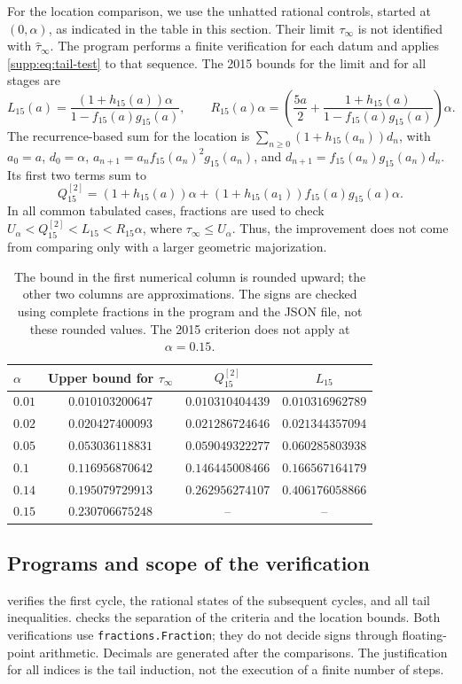 \documentclass[11pt,a4paper]{article}
\numberwithin{equation}{section}
\numberwithin{table}{section}
\theoremstyle{plain}
\theoremstyle{definition}\newtheorem{definition}[theorem]{Definition}
\theoremstyle{remark}\newtheorem{remark}[theorem]{Remark}
\begin{document}
For the location comparison, we use the unhatted rational controls,
started at $(0,\alpha)$, as indicated in the table in this section.
Their limit $\tau_\infty$ is not identified with $\widehat\tau_\infty$.
The program  performs a finite
verification for each datum and applies \eqref{supp:eq:tail-test}
to that sequence. The 2015 bounds for the limit and for all stages are
\[
 L_{15}(a)=\frac{(1+h_{15}(a))\alpha}{1-f_{15}(a)g_{15}(a)},\qquad
 R_{15}(a)\alpha=\left(\frac{5a}{2}+
 \frac{1+h_{15}(a)}{1-f_{15}(a)g_{15}(a)}\right)\alpha.
\]
The recurrence-based sum for the location is
$\sum_{n\geq0}(1+h_{15}(a_n))d_n$, with $a_0=a$, $d_0=\alpha$,
$a_{n+1}=a_nf_{15}(a_n)^2g_{15}(a_n)$, and
$d_{n+1}=f_{15}(a_n)g_{15}(a_n)d_n$.
Its first two terms sum to
\[
 Q_{15}^{[2]}=(1+h_{15}(a))\alpha+
 (1+h_{15}(a_1))f_{15}(a)g_{15}(a)\alpha.
\]
In all common tabulated cases, fractions are used to check
$U_\alpha<Q_{15}^{[2]}<L_{15}<R_{15}\alpha$, where
$\tau_\infty\leq U_\alpha$. Thus, the improvement does not come from
comparing only with a larger geometric majorization.

\begin{table}[htbp]
\centering\small
\begin{tabular}{@{}lccc@{}}\toprule
$\alpha$ & Upper bound for $\tau_\infty$ & $Q_{15}^{[2]}$ & $L_{15}$\\\midrule
$0.01$ & $0.010103200647$ & $0.010310404439$ & $0.010316962789$\\
$0.02$ & $0.020427400093$ & $0.021286724646$ & $0.021344357094$\\
$0.05$ & $0.053036118831$ & $0.059049322277$ & $0.060285803938$\\
$0.1$ & $0.116956870642$ & $0.146445008466$ & $0.166567164179$\\
$0.14$ & $0.195079729913$ & $0.262956274107$ & $0.406176058866$\\
$0.15$ & $0.230706675248$ & -- & --\\
\bottomrule\end{tabular}
\caption{The bound in the first numerical column is rounded upward;
the other two columns are approximations. The signs are checked using
complete fractions in the program and the JSON file, not these rounded
values. The 2015 criterion does not apply at $\alpha=0.15$.}
\label{supp:tab:localization}
\end{table}

\subsection{Programs and scope of the verification}
 verifies the first cycle,
the rational states of the subsequent cycles, and all tail inequalities.
 checks the separation of the
criteria and the location bounds. Both verifications use
\texttt{fractions.Fraction}; they do not decide signs through
floating-point arithmetic. Decimals are generated after the comparisons.
The justification for all indices is the tail induction, not the
execution of a finite number of steps.
\end{document}
